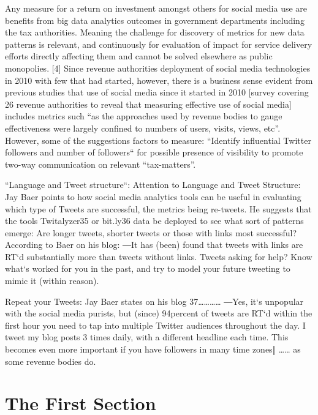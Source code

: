 Any measure for a return on investment amongst others for social media use are benefits from big data analytics outcomes in government departments including the tax authorities.   Meaning the challenge for discovery of metrics for new data patterns is relevant, and continuously for evaluation of impact for service delivery efforts directly affecting them and cannot be solved elsewhere as public monopolies.   
[4] Since revenue authorities deployment of social media technologies in 2010 with few that had started, however, there is a business sense evident from previous studies that use of social media since it started in 2010 [survey covering 26 revenue authorities to reveal that  measuring effective use of social media] includes metrics such “as the approaches used by revenue bodies to gauge effectiveness were largely confined to numbers of users, visits, views, etc”.  However, some of the suggestions factors to measure:
“Identify influential Twitter followers and number of followers“ for possible presence of visibility to promote two-way communication on relevant “tax-matters”.

“Language and Tweet structure“: Attention to Language and Tweet Structure: Jay Baer points to how social media analytics tools can be useful in evaluating which type of Tweets are successful, the metrics being re-tweets. He suggests that the tools Twitalyzer35 or bit.ly36 data be deployed to see what sort of patterns emerge: Are longer tweets, shorter tweets or those with links most successful? According to Baer on his blog: ―It has (been) found that tweets with links are RT‘d substantially more than tweets without links. 
Tweets asking for help? Know what‘s worked for you in the past, and try to model your future tweeting to mimic it (within reason). 

Repeat your Tweets: Jay Baer states on his blog 37………… ―Yes, it‘s unpopular with the social media purists, but (since) 94percent of tweets are RT‘d within the first hour you need to tap into multiple Twitter audiences throughout the day. I tweet my blog posts 3 times daily, with a different headline each time. This becomes even more important if you have followers in many time zones‖ …… as some revenue bodies do.
\section{The First Section}
\label{sec:second:first_sec}


